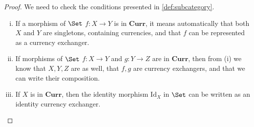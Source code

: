 \begin{proof}
    We need to check the conditions presented in \cref{def:subcategory}.
    \begin{enumerate}[(i)]
        \item If a morphism of $\Set$ $f\colon X\to Y$ is in $\mathbf{Curr}$, it means automatically that both $X$ and $Y$ are singletons, containing currencies, and that $f$ can be represented as a currency exchanger.
        \item If morphisms of $\Set$ $f\colon X\to Y$ and $g\colon Y \to Z$ are in $\mathbf{Curr}$, then from (i) we know that $X,Y,Z$ are as well, that $f,g$ are currency exchangers, and that we can write their composition.
        \item If $X$ is in $\mathbf{Curr}$, then the identity morphism $\text{Id}_X$ in $\Set$ can be written as an identity currency exchanger.
    \end{enumerate}
\end{proof}
    

